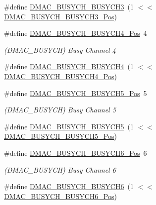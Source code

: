 \begin{DoxyCompactItemize}
\#define \mbox{\hyperlink{group___s_a_m_d21___d_m_a_c_gab26497f77db0f273adc00e02a627809e}{D\+M\+A\+C\+\_\+\+B\+U\+S\+Y\+C\+H\+\_\+\+B\+U\+S\+Y\+C\+H3}}~(1 $<$$<$ \mbox{\hyperlink{group___s_a_m_d21___d_m_a_c_ga9e477848fd14fa9c76720ad3efc9c368}{D\+M\+A\+C\+\_\+\+B\+U\+S\+Y\+C\+H\+\_\+\+B\+U\+S\+Y\+C\+H3\+\_\+\+Pos}})
\item 
\#define \mbox{\hyperlink{group___s_a_m_d21___d_m_a_c_ga21683f6b8e7523f9b7234438cac5e01f}{D\+M\+A\+C\+\_\+\+B\+U\+S\+Y\+C\+H\+\_\+\+B\+U\+S\+Y\+C\+H4\+\_\+\+Pos}}~4
\begin{DoxyCompactList}\small\item\em (D\+M\+A\+C\+\_\+\+B\+U\+S\+Y\+CH) Busy Channel 4 \end{DoxyCompactList}\item 
\#define \mbox{\hyperlink{group___s_a_m_d21___d_m_a_c_ga07547f972d8d68d60fc09ed0f28b826b}{D\+M\+A\+C\+\_\+\+B\+U\+S\+Y\+C\+H\+\_\+\+B\+U\+S\+Y\+C\+H4}}~(1 $<$$<$ \mbox{\hyperlink{group___s_a_m_d21___d_m_a_c_ga21683f6b8e7523f9b7234438cac5e01f}{D\+M\+A\+C\+\_\+\+B\+U\+S\+Y\+C\+H\+\_\+\+B\+U\+S\+Y\+C\+H4\+\_\+\+Pos}})
\item 
\#define \mbox{\hyperlink{group___s_a_m_d21___d_m_a_c_ga1a406090b79f6b060ac17400735d2f13}{D\+M\+A\+C\+\_\+\+B\+U\+S\+Y\+C\+H\+\_\+\+B\+U\+S\+Y\+C\+H5\+\_\+\+Pos}}~5
\begin{DoxyCompactList}\small\item\em (D\+M\+A\+C\+\_\+\+B\+U\+S\+Y\+CH) Busy Channel 5 \end{DoxyCompactList}\item 
\#define \mbox{\hyperlink{group___s_a_m_d21___d_m_a_c_ga9e618b1f555e0c2e77afabcd2bfab02b}{D\+M\+A\+C\+\_\+\+B\+U\+S\+Y\+C\+H\+\_\+\+B\+U\+S\+Y\+C\+H5}}~(1 $<$$<$ \mbox{\hyperlink{group___s_a_m_d21___d_m_a_c_ga1a406090b79f6b060ac17400735d2f13}{D\+M\+A\+C\+\_\+\+B\+U\+S\+Y\+C\+H\+\_\+\+B\+U\+S\+Y\+C\+H5\+\_\+\+Pos}})
\item 
\#define \mbox{\hyperlink{group___s_a_m_d21___d_m_a_c_ga88a78645158efa3e3019cbd15bde8e86}{D\+M\+A\+C\+\_\+\+B\+U\+S\+Y\+C\+H\+\_\+\+B\+U\+S\+Y\+C\+H6\+\_\+\+Pos}}~6
\begin{DoxyCompactList}\small\item\em (D\+M\+A\+C\+\_\+\+B\+U\+S\+Y\+CH) Busy Channel 6 \end{DoxyCompactList}\item 
\#define \mbox{\hyperlink{group___s_a_m_d21___d_m_a_c_gabfa269ea40731b0da1bb1cf04569f705}{D\+M\+A\+C\+\_\+\+B\+U\+S\+Y\+C\+H\+\_\+\+B\+U\+S\+Y\+C\+H6}}~(1 $<$$<$ \mbox{\hyperlink{group___s_a_m_d21___d_m_a_c_ga88a78645158efa3e3019cbd15bde8e86}{D\+M\+A\+C\+\_\+\+B\+U\+S\+Y\+C\+H\+\_\+\+B\+U\+S\+Y\+C\+H6\+\_\+\+Pos}})

\end{DoxyCompactItemize}

